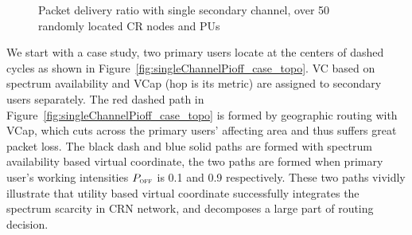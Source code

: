 \begin{figure}[htb!]
\caption{Packet delivery ratio with single secondary channel, over 50 randomly located CR nodes and PUs}
\label{fig:pioff_single}
\end{figure}
We start with a case study, two primary users locate at the centers of dashed cycles as shown in Figure~\ref{fig:singleChannelPioff_case_topo}.
VC based on spectrum availability and VCap (hop is its metric) are assigned to secondary users separately.
The red dashed path in Figure~\ref{fig:singleChannelPioff_case_topo} is formed by geographic routing with VCap, which cuts across the primary users' affecting area and thus suffers great packet loss.
The black dash and blue solid paths are formed with spectrum availability based virtual coordinate, the two paths are formed when primary user's working intensities $P_{\textsc{\tiny OFF}}$ is 0.1 and 0.9 respectively. 
These two paths vividly illustrate that utility based virtual coordinate successfully integrates the spectrum scarcity in CRN network, and decomposes a large part of routing decision.
